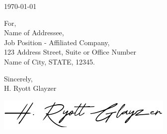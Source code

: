 \documentclass[
10pt, %
letterpaper, %
oneside, %
footinclude, %
BCOR5mm, %
]{scrartcl}
\title{\normalfont\fontsize{20}{10}\selectfont \spacedlowsmallcaps{H. Ryott Glayzer}} %
\subtitle{
    306 East Saint Joseph Street\\
    Rapid City, South Dakota 57701\\
    \href{mailto:ryott@ryott.gay}{ryott@ryott.gay} } %
\date{} %
\newcommand{\ToAddr}[1]{\noindent For,\\ #1}
\newcommand{\LetterDate}[1]{\noindent#1\par\vspace{2em}}
\newcommand{\Sign}[1]{\vspace{2em}\noindent Sincerely,\\ #1\par\vspace{0.5em}}
\begin{document}
\maketitle %

\vspace{-4em}

\LetterDate{\today}
\vspace{-0.8em}
\ToAddr{
    Name of Addressee,\\
    Job Position - Affiliated Company,\\
    123 Address Street, Suite or Office Number\\
    Name of City, STATE, 12345.\\}

\lipsum[1-3] %
 
\Sign{H. Ryott Glayzer}
\noindent\includegraphics[scale=2.5]{signature.png}
\end{document}
